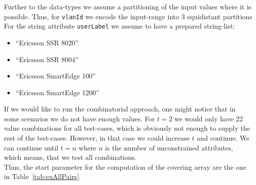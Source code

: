 Further to the data-types we assume a partitioning of the input values where it is possible. Thus, for \verb|vlanId| we encode the input-range into 3 equidistant partitions %
For the string attribute \verb|userLabel| we assume to have a prepared string-list:
\begin{itemize}
 \item ``Ericsson SSR 8020''
 \item ``Ericsson SSR 8004''
 \item ``Ericsson SmartEdge 100''
 \item ``Ericsson SmartEdge 1200''
\end{itemize}


If we would like to run the combinatorial approach, one might notice that in some scenarios we do not have enough values. For $t=2$ we would only have 22 value combinations for all test-cases, which is obviously not enough to supply the rest of the test-cases. However, in that case we could increase $t$ and continue. We can continue until $t=n$ where $n$ is the number of unconstrained attributes, which means, that we test all combinations.\\

Thus, the start parameter for the computation of the covering array are the one in Table~\ref{tab:exAllPairs}.

